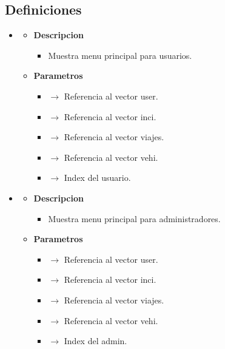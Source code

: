 \subsection{Definiciones}
\begin{itemize}
     \item {}
    \begin{itemize}
        \item \textbf{Descripcion}
        \begin{itemize}
			\item Muestra menu principal para usuarios.
		\end{itemize}
		\item \textbf{Parametros}
		\begin{itemize}
			\item {} $\rightarrow$ Referencia al vector user.
			\item {} $\rightarrow$ Referencia al vector inci.
			\item {} $\rightarrow$ Referencia al vector viajes.
			\item {} $\rightarrow$ Referencia al vector vehi.
			\item {} $\rightarrow$ Index del usuario.
		\end{itemize}
	\end{itemize}
    \item {}
    \begin{itemize}
        \item \textbf{Descripcion}
        \begin{itemize}
			\item Muestra menu principal para administradores.
		\end{itemize}
		\item \textbf{Parametros}
		\begin{itemize}
			\item {} $\rightarrow$ Referencia al vector user.
			\item {} $\rightarrow$ Referencia al vector inci.
			\item {} $\rightarrow$ Referencia al vector viajes.
			\item {} $\rightarrow$ Referencia al vector vehi.
			\item {} $\rightarrow$ Index del admin.
		\end{itemize}
	\end{itemize}
\end{itemize}
\newpage
